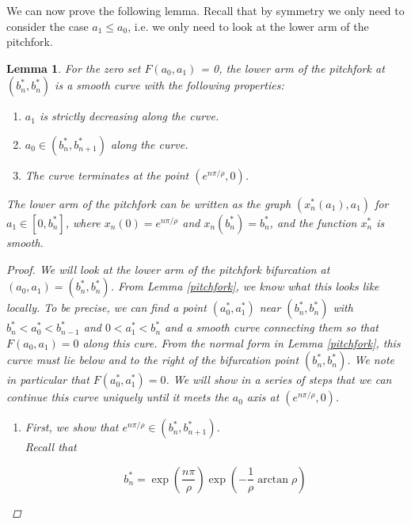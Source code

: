 \documentclass[12pt]{article}
\newtheorem{lemma}{Lemma}
\begin{document}
We can now prove the following lemma. Recall that by symmetry we only need to consider the case $a_1 \leq a_0$, i.e. we only need to look at the lower arm of the pitchfork.


\begin{lemma}\label{pitchcont}
For the zero set $F(a_0, a_1)$ = 0, the lower arm of the pitchfork at $(b_n^*, b_n^*)$ is a smooth curve with the following properties:

\begin{enumerate}
\item $a_1$ is strictly decreasing along the curve.
\item $a_0 \in (b_n^*, b_{n+1}^*)$ along the curve.
\item The curve terminates at the point $(e^{n \pi/\rho}, 0)$.
\end{enumerate}

The lower arm of the pitchfork can be written as the graph $(x_n^*(a_1), a_1)$ for $a_1 \in [0, b_n^*]$, where $x_n(0) = e^{n \pi/\rho}$ and $x_n(b_n^*) = b_n^*$, and the function $x_n^*$ is smooth.

\begin{proof}

We will look at the lower arm of the pitchfork bifurcation at $(a_0, a_1) = (b_n^*, b_n^*)$. From Lemma \ref{pitchfork}, we know what this looks like locally. To be precise, we can find a point $(a_0^*, a_1^*)$ near $(b_n^*, b_n^*)$ with $b_n^* < a_0^* < b_{n-1}^* $ and $0 < a_1^* < b_n^*$ and a smooth curve connecting them so that $F(a_0, a_1) = 0$ along this cure. From the normal form in Lemma \ref{pitchfork}, this curve must lie below and to the right of the bifurcation point $(b_n^*, b_n^*)$. We note in particular that $F(a_0^*, a_1^*) = 0$. We will show in a series of steps that we can continue this curve uniquely until it meets the $a_0$ axis at $(e^{n \pi/\rho}, 0)$.

\begin{enumerate}

\item First, we show that $e^{n \pi/\rho} \in (b^*_n, b^*_{n+1})$.\\

Recall that

\begin{equation*}
b^*_n = \exp\left(\frac{n \pi}{\rho} \right) \exp \left( -\frac{1}{\rho} \arctan \rho \right)
\end{equation*}


\end{enumerate}
\end{proof}
\end{lemma}
\end{document}
